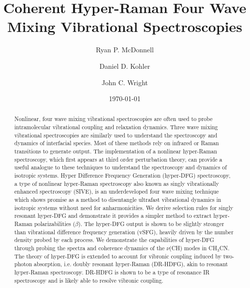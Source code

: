 \documentclass[aip, jcp, reprint, onecolumn]{revtex4-2}
\begin{document}
\title{Coherent Hyper-Raman Four Wave Mixing Vibrational Spectroscopies}


\author{Ryan P. McDonnell} 
\author{Daniel D. Kohler}
\author{John C. Wright} 


\date{\today}

\begin{abstract}
Nonlinear, four wave mixing vibrational spectroscopies are often used to probe intramolecular vibrational coupling and relaxation dynamics.
Three wave mixing vibrational spectroscopies are similarly used to understand the spectroscopy and dynamics of interfacial species.
Most of these methods rely on infrared or Raman transitions to generate output. 
The implementation of a nonlinear hyper-Raman spectroscopy, which first appears at third order perturbation theory, can provide a useful analogue to these techniques to understand the spectroscopy and dynamics of isotropic systems.
Hyper Difference Frequency Generation (hyper-DFG) spectroscopy, a type of nonlinear hyper-Raman spectroscopy also known as singly vibrationally enhanced spectroscopy (SIVE), is an underdeveloped four wave mixing technique which shows promise as a method to disentangle ultrafast vibrational dynamics in isotropic systems without need for anharmonicities.
We derive selection rules for singly resonant hyper-DFG and demonstrate it provides a simpler method to extract hyper-Raman polarizabilities ($\beta$).
The hyper-DFG output is shown to be slightly stronger than vibrational difference frequency generation (vSFG), heavily driven by the number density probed by each process. 
We demonstrate the capabilities of hyper-DFG through probing the spectra and coherence dynamics of the $\nu$(CH) modes in CH$_3$CN.
The theory of hyper-DFG is extended to account for vibronic coupling induced by two-photon absorption, i.e. doubly resonant hyper-Raman (DR-HDFG), akin to resonant hyper-Raman spectroscopy. 
DR-HDFG is shown to be a type of resonance IR spectroscopy and is likely able to resolve vibronic coupling.

\end{abstract}

\maketitle
\end{document}
